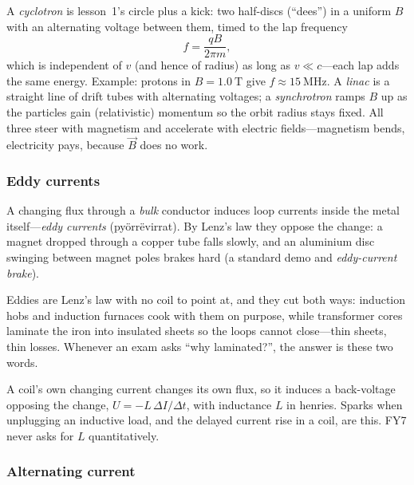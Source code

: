 \begin{remark}\label{rmk:accelerators}
A \emph{cyclotron} is lesson~1's circle plus a kick: two half-discs (``dees'') in a uniform $B$ with an alternating voltage between them, timed to the lap frequency
\[
  f = \frac{qB}{2\pi m},
\]
which is independent of $v$ (and hence of radius) as long as $v\ll c$---each lap adds the same energy. Example: protons in $B = 1.0\ \mathrm{T}$ give $f \approx 15\ \mathrm{MHz}$. A \emph{linac} is a straight line of drift tubes with alternating voltages; a \emph{synchrotron} ramps $B$ up as the particles gain (relativistic) momentum so the orbit radius stays fixed. All three steer with magnetism and accelerate with electric fields---magnetism bends, electricity pays, because $\vec{B}$ does no work.
\end{remark}

\subsubsection{Eddy currents}

\begin{definition}\label{def:eddy}
A changing flux through a \emph{bulk} conductor induces loop currents inside the metal itself---\emph{eddy currents} (py\"orr\"evirrat). By Lenz's law they oppose the change: a magnet dropped through a copper tube falls slowly, and an aluminium disc swinging between magnet poles brakes hard (a standard demo and \emph{eddy-current brake}).
\end{definition}

Eddies are Lenz's law with no coil to point at, and they cut both ways: induction hobs and induction furnaces cook with them on purpose, while transformer cores laminate the iron into insulated sheets so the loops cannot close---thin sheets, thin losses. Whenever an exam asks ``why laminated?'', the answer is these two words.

\begin{remark}\label{rmk:selfind}
A coil's own changing current changes its own flux, so it induces a back-voltage opposing the change, $U = -L\,\Delta I/\Delta t$, with inductance $L$ in henries. Sparks when unplugging an inductive load, and the delayed current rise in a coil, are this. FY7 never asks for $L$ quantitatively.
\end{remark}

\subsubsection{Alternating current}

